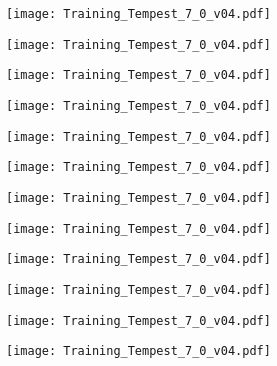 \documentclass[main.tex]{subfiles}
\begin{document}
\begin{center}
\texttt{[image: Training\_Tempest\_7\_0\_v04.pdf]}
\end{center}

\begin{center}
\texttt{[image: Training\_Tempest\_7\_0\_v04.pdf]}
\end{center}

\begin{center}
\texttt{[image: Training\_Tempest\_7\_0\_v04.pdf]}
\end{center}

\begin{center}
\texttt{[image: Training\_Tempest\_7\_0\_v04.pdf]}
\end{center}

\begin{center}
\texttt{[image: Training\_Tempest\_7\_0\_v04.pdf]}
\end{center}

\begin{center}
\texttt{[image: Training\_Tempest\_7\_0\_v04.pdf]}
\end{center}

\begin{center}
\texttt{[image: Training\_Tempest\_7\_0\_v04.pdf]}
\end{center}

\begin{center}
\texttt{[image: Training\_Tempest\_7\_0\_v04.pdf]}
\end{center}

\begin{center}
\texttt{[image: Training\_Tempest\_7\_0\_v04.pdf]}
\end{center}

\begin{center}
\texttt{[image: Training\_Tempest\_7\_0\_v04.pdf]}
\end{center}

\begin{center}
\texttt{[image: Training\_Tempest\_7\_0\_v04.pdf]}
\end{center}

\begin{center}
\texttt{[image: Training\_Tempest\_7\_0\_v04.pdf]}
\end{center}
\end{document}
